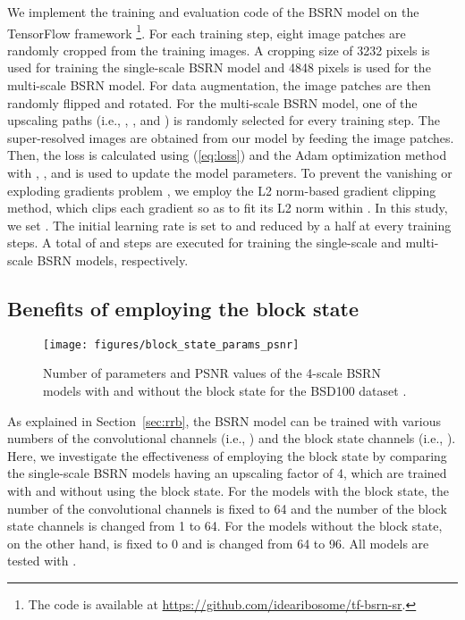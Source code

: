 \documentclass[runningheads]{llncs}
\begin{document}
We implement the training and evaluation code of the BSRN model on the TensorFlow framework \cite{abadi2016tensorflow}\footnote{The code is available at \url{https://github.com/idearibosome/tf-bsrn-sr}.}.
For each training step, eight image patches are randomly cropped from the training images.
A cropping size of 3232 pixels is used for training the single-scale BSRN model and 4848 pixels is used for the multi-scale BSRN model.
For data augmentation, the image patches are then randomly flipped and rotated.
For the multi-scale BSRN model, one of the upscaling paths (i.e., , , and ) is randomly selected for every training step.
The super-resolved images are obtained from our model by feeding the image patches.
Then, the loss is calculated using (\ref{eq:loss}) and the Adam optimization method \cite{kingma2014adam} with , , and  is used to update the model parameters.
To prevent the vanishing or exploding gradients problem \cite{bengio1994learning}, we employ the L2 norm-based gradient clipping method, which clips each gradient so as to fit its L2 norm within .
In this study, we set .
The initial learning rate is set to  and reduced by a half at every  training steps.
A total of  and  steps are executed for training the single-scale and multi-scale BSRN models, respectively.


\subsection{Benefits of employing the block state}
\label{sec:block_state_benefits}

\begin{figure}[t!]
	\begin{center}
		\centering
		\texttt{[image: figures/block\_state\_params\_psnr]}
	\end{center}
	\caption{Number of parameters and PSNR values of the 4-scale BSRN models with and without the block state for the BSD100 dataset \cite{martin2001database}.}
	\label{fig:block_state_params_psnr}
\end{figure}

As explained in Section~\ref{sec:rrb}, the BSRN model can be trained with various numbers of the convolutional channels (i.e., ) and the block state channels (i.e., ).
Here, we investigate the effectiveness of employing the block state by comparing the single-scale BSRN models having an upscaling factor of 4, which are trained with and without using the block state.
For the models with the block state, the number of the convolutional channels  is fixed to 64 and the number of the block state channels  is changed from 1 to 64.
For the models without the block state, on the other hand,  is fixed to 0 and  is changed from 64 to 96.
All models are tested with .
\end{document}
